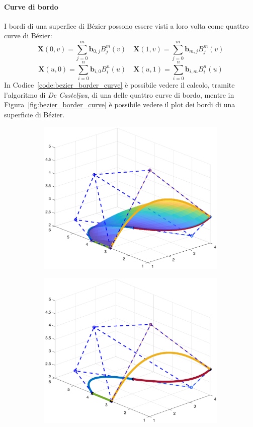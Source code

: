 \documentclass[a4paper, 10pt]{article}
\begin{document}
  \paragraph{Curve di bordo} I bordi di una superfice di Bézier possono essere visti a loro
  volta come quattro curve di Bézier:
  $$\mathbf{X}(0,v) = \sum_{j=0}^{m} \mathbf{b}_{0,j}B_{j}^{m}(v) \quad \mathbf{X}(1,v) = \sum_{j=0}^{m} \mathbf{b}_{m,j}B_{j}^{m}(v)$$
  $$\mathbf{X}(u, 0) = \sum_{i=0}^{n} \mathbf{b}_{i,0}B_{i}^{n}(u) \quad \mathbf{X}(u,1) = \sum_{i=0}^{n} \mathbf{b}_{i, m}B_{i}^{n}(u)$$
  In Codice~\ref{code:bezier_border_curve} è possibile vedere il calcolo, tramite l'algoritmo di \textit{De Casteljau}, di una delle quattro curve di bordo, 
  mentre in Figura~\ref{fig:bezier_border_curve} è possibile vedere 
  il plot dei bordi di una superficie di Bézier.
\begin{figure}[]
  \centering
  \begin{subfigure}[b]{0.3\textwidth}
    \includegraphics[width=\textwidth]{figure/border_curve.eps}
    \label{fig:border_curve}
  \end{subfigure}
  \begin{subfigure}[b]{0.3\textwidth}
      \includegraphics[width=\textwidth]{figure/border_curve_no_surf.eps}

\end{subfigure}
\end{figure}
\end{document}
